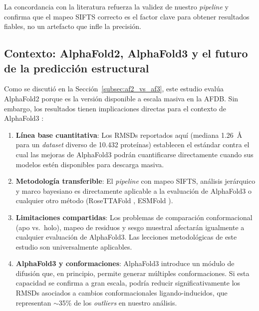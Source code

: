 La concordancia con la literatura refuerza la validez de nuestro \textit{pipeline} y
confirma que el mapeo SIFTS correcto es el factor clave para obtener resultados
fiables, no un artefacto que infle la precisi\'on.

\subsection{Contexto: AlphaFold2, AlphaFold3 y el futuro de la predicci\'on estructural}
\label{subsec:contexto_af3}

Como se discuti\'o en la Secci\'on~\ref{subsec:af2_vs_af3}, este estudio eval\'ua
AlphaFold2 porque es la versi\'on disponible a escala masiva en la AFDB. Sin embargo,
los resultados tienen implicaciones directas para el contexto de AlphaFold3
\citep{abramson2024accurate}:

\begin{enumerate}
    \item \textbf{L\'inea base cuantitativa}: Los RMSDs reportados aqu\'i (mediana
    \SI{1,26}{\angstrom} para un \textit{dataset} diverso de 10.432 prote\'inas) establecen el
    est\'andar contra el cual las mejoras de AlphaFold3 podr\'an cuantificarse
    directamente cuando sus modelos est\'en disponibles para descarga masiva.

    \item \textbf{Metodolog\'ia transferible}: El \textit{pipeline} con mapeo SIFTS, an\'alisis
    jer\'arquico y marco bayesiano es directamente aplicable a la evaluaci\'on de
    AlphaFold3 o cualquier otro m\'etodo (RoseTTAFold \citep{baek2021accurate}, ESMFold
    \citep{lin2023evolutionary}).

    \item \textbf{Limitaciones compartidas}: Los problemas de comparaci\'on
    conformacional (apo vs.\ holo), mapeo de residuos y sesgo muestral afectar\'an
    igualmente a cualquier evaluaci\'on de AlphaFold3. Las lecciones metodol\'ogicas
    de este estudio son universalmente aplicables.

    \item \textbf{AlphaFold3 y conformaciones}: AlphaFold3 introduce un m\'odulo de
    difusi\'on que, en principio, permite generar m\'ultiples conformaciones. Si esta
    capacidad se confirma a gran escala, podr\'ia reducir significativamente los RMSDs
    asociados a cambios conformacionales ligando-inducidos, que representan $\sim$35\%
    de los \textit{outliers} en nuestro an\'alisis.
\end{enumerate}

